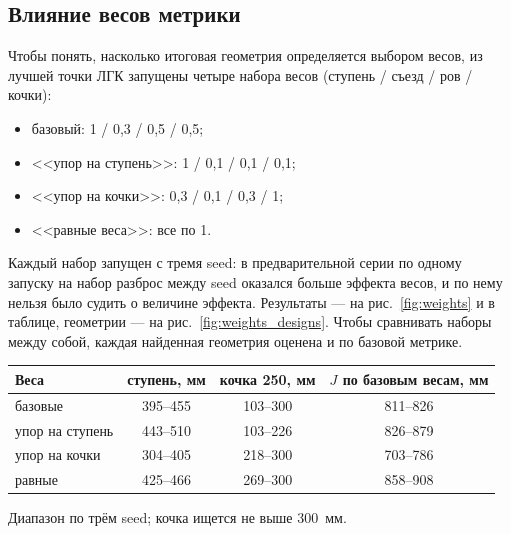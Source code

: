 \documentclass[11pt,a4paper]{article}
\begin{document}
\subsection{Влияние весов метрики}
\label{sec:weights}

Чтобы понять, насколько итоговая геометрия определяется выбором весов, из лучшей точки ЛГК
запущены четыре набора весов (ступень / съезд / ров / кочки):
\begin{itemize}
  \item базовый: 1 / 0,3 / 0,5 / 0,5;
  \item <<упор на ступень>>: 1 / 0,1 / 0,1 / 0,1;
  \item <<упор на кочки>>: 0,3 / 0,1 / 0,3 / 1;
  \item <<равные веса>>: все по 1.
\end{itemize}
Каждый набор запущен с тремя seed: в предварительной серии по одному запуску на набор разброс
между seed оказался больше эффекта весов, и по нему нельзя было судить о величине эффекта.
Результаты --- на рис.~\ref{fig:weights} и в таблице, геометрии --- на рис.~\ref{fig:weights_designs}.
Чтобы сравнивать наборы между собой, каждая найденная геометрия оценена и по базовой метрике.

\begin{center}
\begin{tabular}{lccc}
\toprule
Веса & ступень, мм & кочка 250, мм & $J$ по базовым весам, мм \\
\midrule
базовые & 395--455 & 103--300 & 811--826 \\
упор на ступень & 443--510 & 103--226 & 826--879 \\
упор на кочки & 304--405 & 218--300 & 703--786 \\
равные & 425--466 & 269--300 & 858--908 \\
\bottomrule
\end{tabular}
\end{center}
{\small Диапазон по трём seed; кочка ищется не выше 300~мм.}
\end{document}
